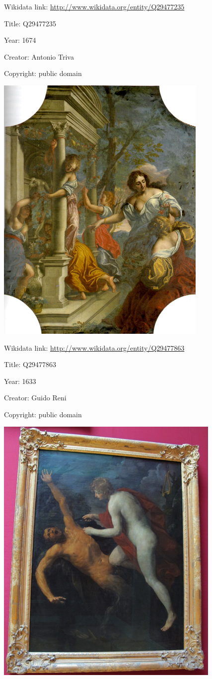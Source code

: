 \documentclass[
  letterpaper,
]{book}
\begin{document}
Wikidata link: \url{http://www.wikidata.org/entity/Q29477235}

Title: Q29477235

Year: 1674

Creator: Antonio Triva

Copyright: public domain

\includegraphics{./paintings_files/figure-pdf/cell-2-output-8.png}

Wikidata link: \url{http://www.wikidata.org/entity/Q29477863}

Title: Q29477863

Year: 1633

Creator: Guido Reni

Copyright: public domain

\includegraphics{./paintings_files/figure-pdf/cell-2-output-10.png}
\end{document}
